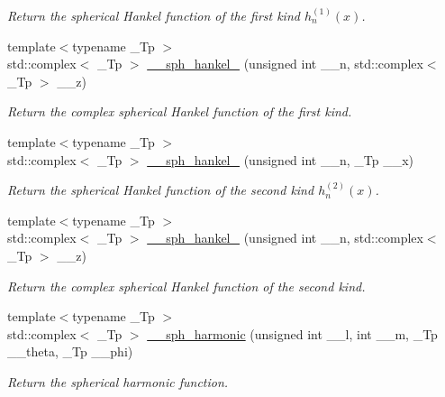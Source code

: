 \begin{DoxyCompactItemize}
\begin{DoxyCompactList}\small\item\em Return the spherical Hankel function of the first kind $ h^{(1)}_n(x) $. \end{DoxyCompactList}\item 
{\footnotesize template$<$typename \+\_\+\+Tp $>$ }\\std\+::complex$<$ \+\_\+\+Tp $>$ \hyperlink{namespacestd_1_1____detail_a887838c407a7cdb7c4ee145a18d2aa12}{\+\_\+\+\_\+sph\+\_\+hankel\+\_} (unsigned int \+\_\+\+\_\+n, std\+::complex$<$ \+\_\+\+Tp $>$ \+\_\+\+\_\+z)
\begin{DoxyCompactList}\small\item\em Return the complex spherical Hankel function of the first kind. \end{DoxyCompactList}\item 
{\footnotesize template$<$typename \+\_\+\+Tp $>$ }\\std\+::complex$<$ \+\_\+\+Tp $>$ \hyperlink{namespacestd_1_1____detail_a89fe914f377a138d37369d13bda1162e}{\+\_\+\+\_\+sph\+\_\+hankel\+\_} (unsigned int \+\_\+\+\_\+n, \+\_\+\+Tp \+\_\+\+\_\+x)
\begin{DoxyCompactList}\small\item\em Return the spherical Hankel function of the second kind $ h^{(2)}_n(x) $. \end{DoxyCompactList}\item 
{\footnotesize template$<$typename \+\_\+\+Tp $>$ }\\std\+::complex$<$ \+\_\+\+Tp $>$ \hyperlink{namespacestd_1_1____detail_ade83ff0131b8880428cbd58028d89bc5}{\+\_\+\+\_\+sph\+\_\+hankel\+\_} (unsigned int \+\_\+\+\_\+n, std\+::complex$<$ \+\_\+\+Tp $>$ \+\_\+\+\_\+z)
\begin{DoxyCompactList}\small\item\em Return the complex spherical Hankel function of the second kind. \end{DoxyCompactList}\item 
{\footnotesize template$<$typename \+\_\+\+Tp $>$ }\\std\+::complex$<$ \+\_\+\+Tp $>$ \hyperlink{namespacestd_1_1____detail_a31b9beb882431d61d439862de0366eec}{\+\_\+\+\_\+sph\+\_\+harmonic} (unsigned int \+\_\+\+\_\+l, int \+\_\+\+\_\+m, \+\_\+\+Tp \+\_\+\+\_\+theta, \+\_\+\+Tp \+\_\+\+\_\+phi)
\begin{DoxyCompactList}\small\item\em Return the spherical harmonic function. \end{DoxyCompactList}\item 

\end{DoxyCompactItemize}
